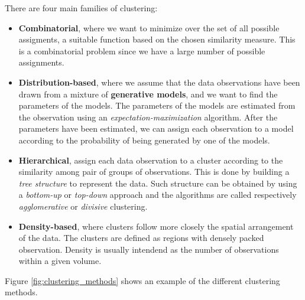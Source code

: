 There are four main families of clustering:
\begin{itemize}
    \item \textbf{Combinatorial}, where we want to minimize over the set of all possible assigments, a suitable function based on the chosen similarity measure. This is a combinatorial problem since we have a large number of possible assignments.
    \item \textbf{Distribution-based}, where we assume that the data observations have been drawn from a mixture of \textbf{generative models}, and we want to find the parameters of the models. The parameters of the models are estimated from the observation using an \textit{expectation-maximization} algorithm. After the parameters have been estimated, we can assign each observation to a model according to the probability of being generated by one of the models.
    \item \textbf{Hierarchical}, assign each data observation to a cluster according to the similarity among pair of groups of observations. This is done by building a \textit{tree structure} to represent the data. Such structure can be obtained by using a \textit{bottom-up} or \textit{top-down} approach and the algorithms are called respectively \textit{agglomerative} or \textit{divisive} clustering.
    \item \textbf{Density-based}, where clusters follow more closely the spatial arrangement of the data. The clusters are defined as regions with densely packed observation. Density is usually intendend as the number of observations within a given volume.
\end{itemize}

Figure \ref{fig:clustering_methods} shows an example of the different clustering methods.

